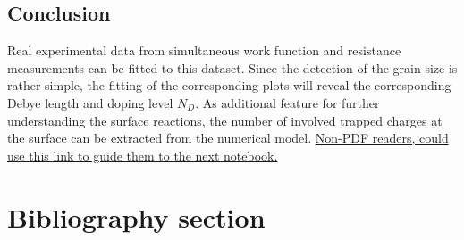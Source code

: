 \documentclass[11pt]{article}
\begin{document}
\hypertarget{conclusion}{%
\subsection{Conclusion}\label{conclusion}}

Real experimental data from simultaneous work function and resistance
measurements can be fitted to this dataset. Since the detection of the
grain size is rather simple, the fitting of the corresponding plots will
reveal the corresponding Debye length and doping level \(N_D\). As
additional feature for further understanding the surface reactions, the
number of involved trapped charges at the surface can be extracted from
the numerical model. \href{./4-Exp-data.ipynb}{Non-PDF readers, could
use this link to guide them to the next notebook.}

    \hypertarget{bibliography-section}{%
\section{Bibliography section}\label{bibliography-section}}

    



    
    
    
\end{document}
